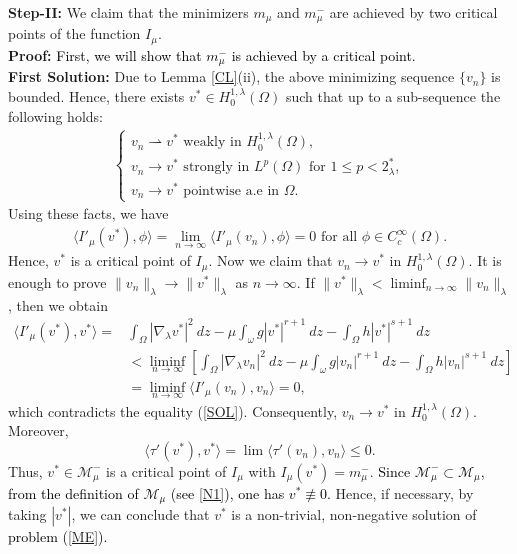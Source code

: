 \documentclass[12pt, notitlepage]{article}
\begin{document}
{\textbf{Step-II:}
We claim that the minimizers $m_\mu$ and $m^-_\mu$ are achieved by two critical points of the function $I_\mu$.\\
\textbf{Proof:} \textcolor{black}{First, we will show that $m^-_\mu$ is achieved by a critical point.}\\
\textbf{ First Solution:}
Due to Lemma \ref{CL}(ii), the above minimizing sequence $\{v_n\}$ is bounded. Hence, there exists $v^*\in H^{1,\lambda}_0(\Omega)$ such that up to a sub-sequence the following holds:
\begin{align}
    \begin{cases}
        v_n\rightharpoonup v^* \text{ weakly in } H^{1,\lambda}_0(\Omega),\\
        v_n\to v^* \text{ strongly in } L^p(\Omega) \text{ for } 1\leq p<2^*_\lambda,\\
        v_n\to v^* \text{ pointwise a.e in } \Omega.
    \end{cases}
\end{align}
Using these facts, we have 
\begin{align}\label{SOL}
    \langle I'_\mu(v^*),\phi\rangle=\lim_{n\to\infty} \langle I'_\mu(v_n),\phi\rangle=0 \text{ for all } \phi\in C^\infty_c(\Omega).
\end{align}
Hence, $v^*$ is a critical point of $I_\mu$. Now we claim that $v_n\to v^*$ in $H^{1,\lambda}_0(\Omega)$. It is enough to prove $\|v_n\|_\lambda\to\|v^*\|_\lambda$ as $n\to\infty.$ If $\|v^*\|_\lambda<\liminf_{n\to\infty}\|v_n\|_\lambda$, then we obtain
\begin{align*}
   \langle I'_\mu(v^*),v^*\rangle=&\int_\Omega |\nabla_\lambda v^*|^2\ dz-\mu\int_\omega g|v^*|^{r+1}\ dz-\int_\Omega h|v^*|^{s+1}\ dz\\
   &<\liminf_{n\to\infty}\left [ \int_\Omega |\nabla_\lambda v_n|^2\ dz-\mu\int_\omega g|v_n|^{r+1}\ dz-\int_\Omega h|v_n|^{s+1}\ dz \right ]\\
   &=\liminf_{n\to\infty} \langle I'_\mu(v_n),v_n\rangle=0,
\end{align*}
which contradicts the equality (\ref{SOL}). Consequently, $v_n\to v^*$ in $H^{1,\lambda}_0(\Omega)$. Moreover, $$\langle\tau'(v^*),v^*\rangle=\lim \langle\tau'(v_n),v_n\rangle\leq 0.$$ Thus, $v^*\in\mathcal{M}^-_\mu$ is a critical point of $I_\mu$ with $I_\mu(v^*)=m^-_\mu$. \textcolor{black}{Since $\mathcal{M}^-_\mu\subset \mathcal{M}_\mu$, from the definition of $\mathcal{M}_\mu$ (see \ref{N1}), one has $v^*\not\equiv 0$.} Hence, if necessary, by taking $|v^*|$, we can conclude that $v^*$ is a non-trivial, non-negative solution of \textcolor{black}{problem (\ref{ME})}.\\
}
\end{document}
